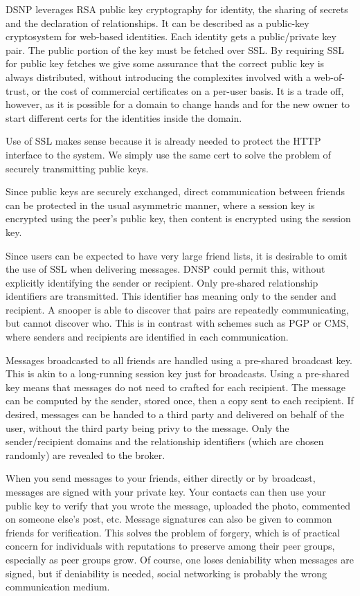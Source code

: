 \documentclass[letterpaper,11pt,oneside]{article}
\begin{document}
DSNP leverages RSA public key cryptography for identity, the sharing of secrets
and the declaration of relationships. It can be described as a public-key
cryptosystem for web-based identities. Each identity gets a public/private key
pair. The public portion of the key must be fetched over SSL. By requiring SSL
for public key fetches we give some assurance that the correct public key is
always distributed, without introducing the complexites involved with a
web-of-trust, or the cost of commercial certificates on a per-user basis. It is
a trade off, however, as it is possible for a domain to change hands and for
the new owner to start different certs for the identities inside the domain.

Use of SSL makes sense because it is already needed to protect the HTTP
interface to the system. We simply use the same cert to solve the problem of
securely transmitting public keys.

Since public keys are securely exchanged, direct communication between friends
can be protected in the usual asymmetric manner, where a session key is
encrypted using the peer's public key, then content is encrypted using the
session key.

Since users can be expected to have very large friend lists, it is desirable to
omit the use of SSL when delivering messages. DNSP could permit this, without
explicitly identifying the sender or recipient. Only pre-shared relationship
identifiers are transmitted. This identifier has meaning only to the sender and
recipient. A snooper is able to discover that pairs are repeatedly
communicating, but cannot discover who. This is in contrast with schemes such
as PGP or CMS, where senders and recipients are identified in each
communication.

Messages broadcasted to all friends are handled using a pre-shared broadcast
key. This is akin to a long-running session key just for broadcasts. Using a
pre-shared key means that messages do not need to crafted for each recipient.
The message can be computed by the sender, stored once, then a copy sent to
each recipient. If desired, messages can be handed to a third party and
delivered on behalf of the user, without the third party being privy to the
message. Only the sender/recipient domains and the relationship identifiers
(which are chosen randomly) are revealed to the broker. 

When you send messages to your friends, either directly or by broadcast,
messages are signed with your private key. Your contacts can then use your
public key to verify that you wrote the message, uploaded the photo, commented
on someone else's post, etc. Message signatures can also be given to common
friends for verification. This solves the problem of forgery, which is of
practical concern for individuals with reputations to preserve among their peer
groups, especially as peer groups grow. Of course, one loses deniability when
messages are signed, but if deniability is needed, social networking is
probably the wrong communication medium.
\end{document}
